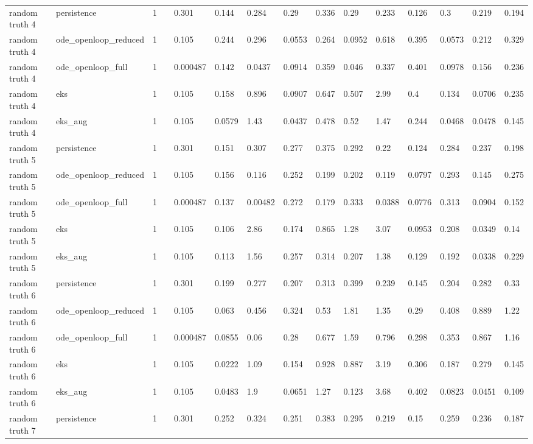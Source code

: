 \begin{table}[t]
\begin{tabular}{lllllllllllllll}
random truth 4 & persistence & 1 &  & 0.301 & 0.144 & 0.284 & 0.29 & 0.336 & 0.29 & 0.233 & 0.126 & 0.3 & 0.219 & 0.194 \\
random truth 4 & ode\_openloop\_reduced & 1 &  & 0.105 & 0.244 & 0.296 & 0.0553 & 0.264 & 0.0952 & 0.618 & 0.395 & 0.0573 & 0.212 & 0.329 \\
random truth 4 & ode\_openloop\_full & 1 &  & 0.000487 & 0.142 & 0.0437 & 0.0914 & 0.359 & 0.046 & 0.337 & 0.401 & 0.0978 & 0.156 & 0.236 \\
random truth 4 & eks & 1 &  & 0.105 & 0.158 & 0.896 & 0.0907 & 0.647 & 0.507 & 2.99 & 0.4 & 0.134 & 0.0706 & 0.235 \\
random truth 4 & eks\_aug & 1 &  & 0.105 & 0.0579 & 1.43 & 0.0437 & 0.478 & 0.52 & 1.47 & 0.244 & 0.0468 & 0.0478 & 0.145 \\
random truth 5 & persistence & 1 &  & 0.301 & 0.151 & 0.307 & 0.277 & 0.375 & 0.292 & 0.22 & 0.124 & 0.284 & 0.237 & 0.198 \\
random truth 5 & ode\_openloop\_reduced & 1 &  & 0.105 & 0.156 & 0.116 & 0.252 & 0.199 & 0.202 & 0.119 & 0.0797 & 0.293 & 0.145 & 0.275 \\
random truth 5 & ode\_openloop\_full & 1 &  & 0.000487 & 0.137 & 0.00482 & 0.272 & 0.179 & 0.333 & 0.0388 & 0.0776 & 0.313 & 0.0904 & 0.152 \\
random truth 5 & eks & 1 &  & 0.105 & 0.106 & 2.86 & 0.174 & 0.865 & 1.28 & 3.07 & 0.0953 & 0.208 & 0.0349 & 0.14 \\
random truth 5 & eks\_aug & 1 &  & 0.105 & 0.113 & 1.56 & 0.257 & 0.314 & 0.207 & 1.38 & 0.129 & 0.192 & 0.0338 & 0.229 \\
random truth 6 & persistence & 1 &  & 0.301 & 0.199 & 0.277 & 0.207 & 0.313 & 0.399 & 0.239 & 0.145 & 0.204 & 0.282 & 0.33 \\
random truth 6 & ode\_openloop\_reduced & 1 &  & 0.105 & 0.063 & 0.456 & 0.324 & 0.53 & 1.81 & 1.35 & 0.29 & 0.408 & 0.889 & 1.22 \\
random truth 6 & ode\_openloop\_full & 1 &  & 0.000487 & 0.0855 & 0.06 & 0.28 & 0.677 & 1.59 & 0.796 & 0.298 & 0.353 & 0.867 & 1.16 \\
random truth 6 & eks & 1 &  & 0.105 & 0.0222 & 1.09 & 0.154 & 0.928 & 0.887 & 3.19 & 0.306 & 0.187 & 0.279 & 0.145 \\
random truth 6 & eks\_aug & 1 &  & 0.105 & 0.0483 & 1.9 & 0.0651 & 1.27 & 0.123 & 3.68 & 0.402 & 0.0823 & 0.0451 & 0.109 \\
random truth 7 & persistence & 1 &  & 0.301 & 0.252 & 0.324 & 0.251 & 0.383 & 0.295 & 0.219 & 0.15 & 0.259 & 0.236 & 0.187 \\

\end{tabular}
\end{table}
